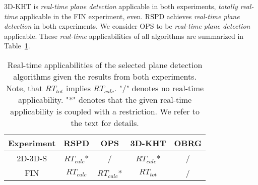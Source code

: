 \documentclass[main.tex]{subfiles}
\begin{document}
3D-KHT is \textit{real-time plane detection} applicable in both experiments, \textit{totally real-time} applicable
in the FIN experiment, even.
RSPD achieves \textit{real-time plane detection} in both experiments.
We consider OPS to be \textit{real-time plane detection} applicable.
These \textit{real-time} applicabilities of all algorithms are summarized in Table~\ref{tab:algo-rt}.

\begin{table}[H]
    \centering
    \begin{tabular}{c|cccc}
        Experiment & RSPD         & OPS          & 3D-KHT       & OBRG \\ \hline
        2D-3D-S    & $RT_{calc}$* & /            & $RT_{calc}$* & /    \\
        FIN        & $RT_{calc}$  & $RT_{calc}$* & $RT_{tot}$   & /
    \end{tabular}
    \caption{Real-time applicabilities of the selected plane detection algorithms given the results from both experiments.
        Note, that $RT_{tot}$ implies $RT_{calc}$. "/" denotes no real-time applicability.
        "*" denotes that the given real-time applicability is coupled with a restriction. We refer to the text for details.}
    \label{tab:algo-rt}
\end{table}
\end{document}
